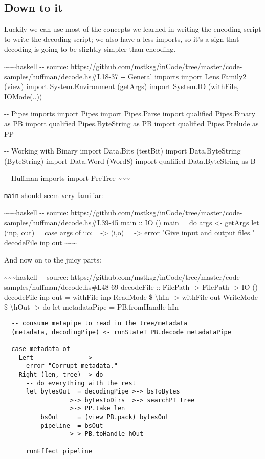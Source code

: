 \documentclass[]{article}
\begin{document}
\subsection{Down to it}

Luckily we can use most of the concepts we learned in writing the encoding
script to write the decoding script; we also have a less imports, so it's a sign
that decoding is going to be slightly simpler than encoding.

\textasciitilde{}\textasciitilde{}\textasciitilde{}haskell -\/- source:
https://github.com/mstksg/inCode/tree/master/code-samples/huffman/decode.hs\#L18-37
-\/- General imports import Lens.Family2 (view) import System.Environment
(getArgs) import System.IO (withFile, IOMode(..))

-\/- Pipes imports import Pipes import Pipes.Parse import qualified Pipes.Binary
as PB import qualified Pipes.ByteString as PB import qualified Pipes.Prelude as
PP

-\/- Working with Binary import Data.Bits (testBit) import Data.ByteString
(ByteString) import Data.Word (Word8) import qualified Data.ByteString as B

-\/- Huffman imports import PreTree
\textasciitilde{}\textasciitilde{}\textasciitilde{}

\texttt{main} should seem very familiar:

\textasciitilde{}\textasciitilde{}\textasciitilde{}haskell -\/- source:
https://github.com/mstksg/inCode/tree/master/code-samples/huffman/decode.hs\#L39-45
main :: IO () main = do args \textless{}- getArgs let (inp, out) = case args of
i:o:\_ -\textgreater{} (i,o) \_ -\textgreater{} error "Give input and output
files." decodeFile inp out \textasciitilde{}\textasciitilde{}\textasciitilde{}

And now on to the juicy parts:

\textasciitilde{}\textasciitilde{}\textasciitilde{}haskell -\/- source:
https://github.com/mstksg/inCode/tree/master/code-samples/huffman/decode.hs\#L48-69
decodeFile :: FilePath -\textgreater{} FilePath -\textgreater{} IO () decodeFile
inp out = withFile inp ReadMode \$ \textbackslash{}hIn -\textgreater{} withFile
out WriteMode \$ \textbackslash{}hOut -\textgreater{} do let metadataPipe =
PB.fromHandle hIn

\begin{verbatim}
  -- consume metapipe to read in the tree/metadata
  (metadata, decodingPipe) <- runStateT PB.decode metadataPipe

  case metadata of
    Left   _          ->
      error "Corrupt metadata."
    Right (len, tree) -> do
      -- do everything with the rest
      let bytesOut  = decodingPipe >-> bsToBytes
                  >-> bytesToDirs  >-> searchPT tree
                  >-> PP.take len
          bsOut     = (view PB.pack) bytesOut
          pipeline  = bsOut
                  >-> PB.toHandle hOut

      runEffect pipeline
\end{verbatim}
\end{document}
